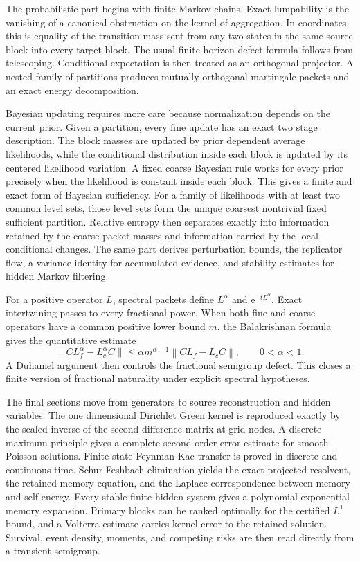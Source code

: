 \documentclass[11pt,letterpaper]{article}
\theoremstyle{plain}
\theoremstyle{plain}
\theoremstyle{plain}
\theoremstyle{definition}
\theoremstyle{definition}
\theoremstyle{definition}
\theoremstyle{definition}
\theoremstyle{definition}
\theoremstyle{remark}
\theoremstyle{remark}
\theoremstyle{remark}
\theoremstyle{remark}
\theoremstyle{remark}
\newcommand{\norm}[1]{\left\lVert#1\right\rVert}
\theoremstyle{remark}
\newcommand{\e}{\mathrm e}
\let\KomorebiPrimitivemathrm\mathrm
\renewcommand{\mathrm}[1]{{\KomorebiPrimitivemathrm{#1}}}
\begin{document}
The probabilistic part begins with finite Markov chains. Exact lumpability is the vanishing of a canonical obstruction on the kernel of aggregation. In coordinates, this is equality of the transition mass sent from any two states in the same source block into every target block. The usual finite horizon defect formula follows from telescoping. Conditional expectation is then treated as an orthogonal projector. A nested family of partitions produces mutually orthogonal martingale packets and an exact energy decomposition.

Bayesian updating requires more care because normalization depends on the current prior. Given a partition, every fine update has an exact two stage description. The block masses are updated by prior dependent average likelihoods, while the conditional distribution inside each block is updated by its centered likelihood variation. A fixed coarse Bayesian rule works for every prior precisely when the likelihood is constant inside each block. This gives a finite and exact form of Bayesian sufficiency. For a family of likelihoods with at least two common level sets, those level sets form the unique coarsest nontrivial fixed sufficient partition. Relative entropy then separates exactly into information retained by the coarse packet masses and information carried by the local conditional changes. The same part derives perturbation bounds, the replicator flow, a variance identity for accumulated evidence, and stability estimates for hidden Markov filtering.

For a positive operator \(L\), spectral packets define \(L^\alpha\) and \(\e^{-tL^\alpha}\). Exact intertwining passes to every fractional power. When both fine and coarse operators have a common positive lower bound \(m\), the Balakrishnan formula gives the quantitative estimate
\[
\norm{CL_f^\alpha-L_c^\alpha C}
\leq
\alpha m^{\alpha-1}
\norm{CL_f-L_cC},
\qquad 0<\alpha<1.
\]
A Duhamel argument then controls the fractional semigroup defect. This closes a finite version of fractional naturality under explicit spectral hypotheses.

The final sections move from generators to source reconstruction and hidden variables. The one dimensional Dirichlet Green kernel is reproduced exactly by the scaled inverse of the second difference matrix at grid nodes. A discrete maximum principle gives a complete second order error estimate for smooth Poisson solutions. Finite state Feynman Kac transfer is proved in discrete and continuous time. Schur Feshbach elimination yields the exact projected resolvent, the retained memory equation, and the Laplace correspondence between memory and self energy. Every stable finite hidden system gives a polynomial exponential memory expansion. Primary blocks can be ranked optimally for the certified \(L^1\) bound, and a Volterra estimate carries kernel error to the retained solution. Survival, event density, moments, and competing risks are then read directly from a transient semigroup.
\end{document}
